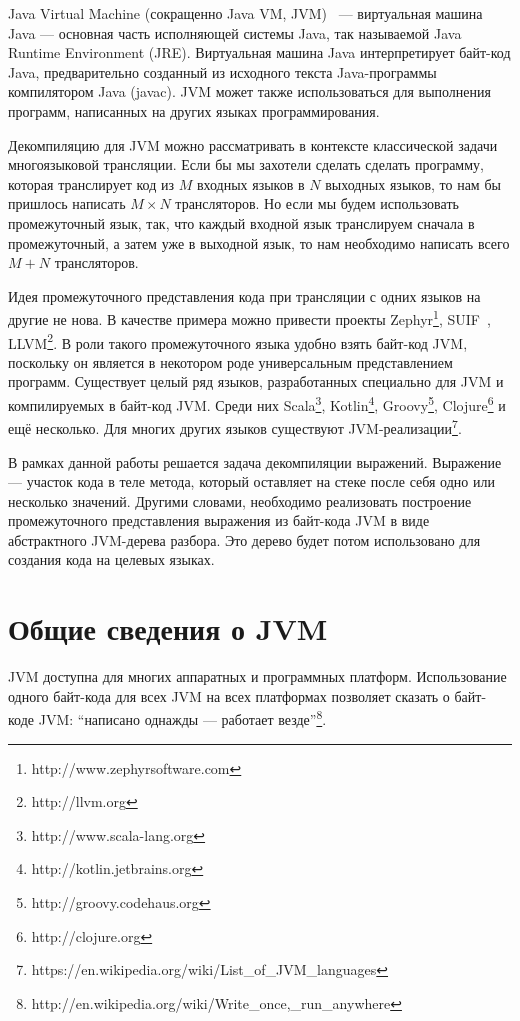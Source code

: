 Java Virtual Machine (сокращенно Java VM, JVM)~\cite{jvms} --- виртуальная машина Java --- основная часть исполняющей системы 
Java, так называемой Java Runtime Environment (JRE). Виртуальная машина Java интерпретирует байт-код Java, 
предварительно созданный из исходного текста Java-программы компилятором Java (javac). JVM может 
также использоваться для выполнения программ, написанных на других языках программирования.

Декомпиляцию для JVM можно рассматривать в контексте классической задачи многоязыковой трансляции. 
Если бы мы захотели сделать сделать программу, которая транслирует код из $M$ входных языков в $N$ выходных 
языков, то нам бы пришлось написать $M\times N$ трансляторов. Но если мы будем использовать промежуточный 
язык, так, что каждый входной язык транслируем сначала в промежуточный, а затем уже в выходной язык, то нам 
необходимо написать всего $M + N$ трансляторов. 

Идея промежуточного представления кода при трансляции с одних языков на другие не нова. В качестве 
примера можно привести проекты Zephyr\footnote{http://www.zephyrsoftware.com}, 
SUIF~\cite{book:suif}, LLVM\footnote{http://llvm.org}. В роли такого промежуточного языка удобно взять байт-код 
JVM, поскольку он является в некотором роде универсальным представлением программ. Существует целый ряд 
языков, разработанных специально для JVM и компилируемых в байт-код JVM. Среди них Scala\footnote{http://www.scala-lang.org}, 
Kotlin\footnote{http://kotlin.jetbrains.org}, Groovy\footnote{http://groovy.codehaus.org}, Clojure\footnote{http://clojure.org} 
и ещё несколько. Для многих других языков существуют JVM-реализации\footnote{https://en.wikipedia.org/wiki/List\_of\_JVM\_languages}. 

В рамках данной работы решается задача декомпиляции выражений. Выражение --- участок кода в теле метода, 
который оставляет на стеке после себя одно или несколько значений. Другими словами, необходимо реализовать 
построение промежуточного представления выражения из байт-кода JVM в виде абстрактного JVM-дерева разбора. 
Это дерево будет потом использовано для создания кода на целевых языках. 

\section{Общие сведения о JVM}

JVM доступна для многих аппаратных и программных платформ. Использование одного байт-кода для всех JVM на всех 
платформах позволяет сказать о байт-коде JVM: ``написано однажды --- работает везде''\footnote{http://en.wikipedia.org/wiki/Write\_once,\_run\_anywhere}.

